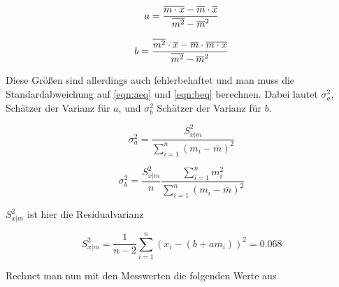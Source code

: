 \begin{minipage}{0.4\textwidth}
\begin{equation}
a = {{\overline{m \cdot x} - \overline{m}\cdot
    \overline{x}} \over {\overline{m^2} - {\overline{m}}^2}}
\label{eqn:aeq}
\end{equation}
\end{minipage}
\begin{minipage}{0.4\textwidth}
\begin{equation}
b = {{\overline{m^2} \cdot \overline{x} -    \overline{m} \cdot {\overline{m \cdot x}}}\over{\overline{m^2} -    {\overline{m}}^2}}
\label{eqn:beq}
\end{equation}
\end{minipage}

\begin{flushleft}
Diese Größen sind allerdings auch fehlerbehaftet und man muss die Standardabweichung auf \eqref{eqn:aeq} und \eqref{eqn:beq} berechnen.
Dabei lautet $\sigma_a^2$, Schätzer der Varianz für $a$, und $\sigma_b^2$ Schätzer der Varianz für $b$.
\end{flushleft}
\begin{minipage}{0.45\textwidth}
\begin{equation}
\sigma_a^2 = \frac{S_{x|m}^2}{\sum_{i=1}^n (m_i - \overline{m})^2}
\label{eqn:standarderrora}
\end{equation}
\end{minipage}
\begin{minipage}{0.45\textwidth}
\begin{equation}
\sigma_b^2 = \frac{S_{x|m}^2}{n} \frac{\sum_{i=1}^n m_i^2}{\sum_{i=1}^n (m_i - \overline{m})^2}
\label{eqn:standarderrorb}
\end{equation}
\end{minipage}

\begin{flushleft}
$S_{x|m}^2$ ist hier die Residualvarianz
\end{flushleft}
\begin{equation}
S_{x|m}^2 = \frac{1}{n-2} \sum_{i=1}^n (x_i - (b + a m_i))^2 = 0.068
\end{equation}
\begin{flushleft}
Rechnet man nun mit den Messwerten die folgenden Werte aus
\end{flushleft}


